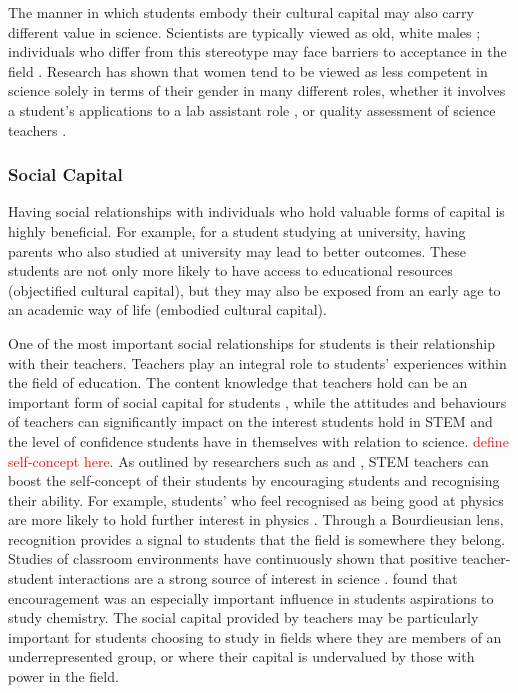 The manner in which students embody their cultural capital may also carry different value in science. Scientists are typically viewed as old, white males \cite{Nosek_2009,Barthelemy_2016}; individuals who differ from this stereotype may face barriers to acceptance in the field \cite{ong2005body}. Research has shown that women tend to be viewed as less competent in science solely in terms of their gender in many different roles, whether it involves a student's applications to a lab assistant role \cite{Moss_2012}, or quality assessment of science teachers \cite{Potvin_2016}. 

\subsubsection*{Social Capital}
Having social relationships with individuals who hold valuable forms of capital is highly beneficial. For example, for a student studying at university, having parents who also studied at university may lead to better outcomes. These students are not only more likely to have access to educational resources (objectified cultural capital), but they may also be exposed from an early age to an academic way of life (embodied cultural capital).

One of the most important social relationships for students is their relationship with their teachers. Teachers play an integral role to students' experiences within the field of education. The content knowledge that teachers hold can be an important form of social capital for students \cite{goldhaber2000does,wayne2003teacher,keller2017impact}, while the attitudes and behaviours of teachers can significantly impact on the interest students hold in STEM \cite{keller2017impact} and the level of confidence students have in themselves with relation to science. \textcolor{red}{define self-concept here}. As outlined by researchers such as \cite{bandura1986explanatory} and \cite{siegle2007increasing}, STEM teachers can boost the self-concept of their students by encouraging students and recognising their ability. For example, students' who feel recognised as being good at physics are more likely to hold further interest in physics \cite{Hazari2017}. Through a Bourdieusian lens, recognition provides a signal to students that the field is somewhere they belong. Studies of classroom environments have continuously shown that positive teacher-student interactions are a strong source of interest in science \cite{osborne2003attitudes,keller2017impact}. \cite{mujtaba2018students} found that encouragement was an especially important influence in students aspirations to study chemistry. The social capital provided by teachers may be particularly important for students choosing to study in fields where they are members of an underrepresented group, or where their capital is undervalued by those with power in the field.

